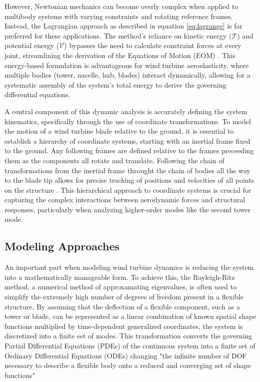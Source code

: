 \documentclass[onecolumn,draftcls]{IEEEtran}
\begin{document}
However, Newtonian mechanics can become overly complex when applied to multibody systems with varying constraints and rotating reference frames. Instead, the Lagrangian approach as described in equation \ref{eq:lagrange} is far preferred for these applications. The method's reliance on kinetic energy ($\mathcal{T}$) and potential energy ($\mathcal{V}$) bypasses the need to  calculate constraint forces at every joint, streamlining the derivation of the Equations of Motion (EOM) \cite{Branlard2025notes}. This energy-based formulation is advantageous for wind turbine aeroelasticity, where multiple bodies (tower, nacelle, hub, blades) interact dynamically, allowing for a systematic assembly of the system's total energy to derive the governing differential equations.

A central component of this dynamic analysis is accurately defining the system kinematics, specifically through the use of coordinate transformations. To model the motion of a wind turbine blade relative to the ground, it is essential to establish a hierarchy of coordinate systems, starting with an inertial frame fixed to the ground. Any following frames are defined relative to the frames preceeding them as the components all rotate and translate. Following the chain of transformations from the inertial frame throught the chain of bodies all the way to the blade tip allows for precise tracking of positions and velocities of all points on the structure \cite{Branlard2025notes}. This hierarchical approach to coordinate systems is crucial for capturing the complex interactions between aerodynamic forces and structural responses, particularly when analyzing higher-order modes like the second tower mode.

\subsection*{Modeling Approaches}
An important part when modeling wind turbine dynamics is reducing the system into a mathematically manageable form. To achieve this, the Rayleigh-Ritz method, a numerical method of approxamating eigenvalues, is often used to simplify the extremely high number of degrees of freedom present in a flexible structure. By assuming that the deflection of a flexible component, such as a tower or blade, can be represented as a linear combination of known spatial shape functions multiplied by time-dependent generalized coordinates, the system is discretized into a finite set of modes. This transformation converts the governing Partial Differential Equations (PDEs) of the continuous system into a finite set of Ordinary Differential Equations (ODEs) changing "the infinite number of DOF necessary to describe a flexible body onto a reduced and converging set of
shape functions" \cite{branlard2019flexible}
\end{document}
